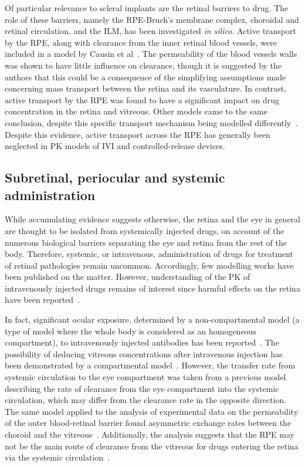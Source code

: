 \documentclass{article}
\begin{document}
Of particular relevance to scleral implants are the retinal barriers to drug.
The role of these barriers, namely the RPE-Bruch's membrane complex, choroidal and retinal circulation, and the ILM, has been investigated \textit{in silico}.
Active transport by the RPE, along with clearance from the inner retinal blood vessels, were included in a model by Causin et al~\cite{Causin_2016}.
The permeability of the blood vessels walls was shown to have little influence on clearance, though it is suggested by the authors that this could be a consequence of the simplifying assumptions made concerning mass transport between the retina and its vasculature.
In contrast, active transport by the RPE was found to have a significant impact on drug concentration in the retina and vitreous.
Other models came to the same conclusion, despite this specific transport mechanism being modelled differently~\cite{Balachandran_2008,Kotha_2014}.
Despite this evidence, active transport across the RPE has generally been neglected in PK models of IVI and controlled-release devices.


\subsection{Subretinal, periocular and systemic administration}

While accumulating evidence suggests otherwise, the retina and the eye in general are thought to be isolated from systemically injected drugs, on account of the numerous biological barriers separating the eye and retina from the rest of the body.
Therefore, systemic, or intravenous, administration of drugs for treatment of retinal pathologies remain uncommon.
Accordingly, few modelling works have been published on the matter.
However, understanding of the PK of intravenously injected drugs remains of interest since harmful effects on the retina have been reported~\cite{Fu_2017}.

In fact, significant ocular exposure, determined by a non-compartmental model (a type of model where the whole body is considered as an homogeneous compartment), to intravenously injected antibodies has been reported~\cite{Shivva_2021}.
The possibility of deducing vitreous concentrations after intravenous injection has been demonstrated by a compartmental model~\cite{Vellonen_2015}.
However, the transfer rate from systemic circulation to the eye compartment was taken from a previous model describing the rate of clearance from the eye compartment into the systemic circulation, which may differ from the clearance rate in the opposite direction.
The same model applied to the analysis of experimental data on the permeability of the outer blood-retinal barrier found asymmetric exchange rates between the choroid and the vitreous~\cite{Ramsay_2019}.
Additionally, the analysis suggests that the RPE may not be the main route of clearance from the vitreous for drugs entering the retina via the systemic circulation~\cite{Ramsay_2019}.
\end{document}
